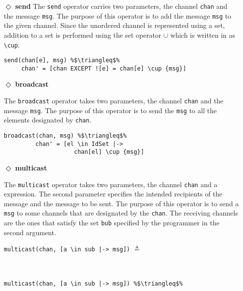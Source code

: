 \begin{itemize}
\item[$\Diamond$]  \textbf{send} The \verb|send| operator carries two parameters, the channel \verb|chan| and the message \verb|msg|. The purpose of this operator is to add the message \verb|msg| to
the given channel. Since the unordered channel is represented using a \tlaplus set, addition to a set is performed using the set operator $\cup$ which is written in \tlaplus as \lstinline|\cup|.


\begin{lstlisting}[frame = none, numbers = none, escapechar=\%]
send(chan[e], msg) %$\triangleq$% 
     chan' = [chan EXCEPT ![e] = chan[e] \cup {msg}]
\end{lstlisting}


\item[$\Diamond$]  \textbf{broadcast}

The \verb|broadcast| operator takes two parameters, the channel \verb|chan| and the message \verb|msg|. The purpose of this operator is to send the \verb|msg| to all the elements designated by \verb|chan|.


\begin{lstlisting}[frame = none, numbers = none, escapechar=\%]
broadcast(chan, msg) %$\triangleq$% 
         chan' = [el \in IdSet |-> 
                    chan[el] \cup {msg}]
\end{lstlisting}

\item[$\Diamond$] \textbf{multicast}

The \verb|multicast| operator takes two parameters, the channel \verb|chan| and a \tlaplus expression. The second parameter specifies the intended recipients of the message and the message to be sent. The purpose of this operator is to send a \verb|msg| to some channels that are designated by the \verb|chan|. The receiving channels are the ones that satisfy the set \verb|bub| specified by the programmer in the second argument.

\begin{minipage}{.4\textwidth}

\lstinline!multicast(chan, [a \in sub |-> msg])! $\triangleq$\\\\\\
\end{minipage}\hfill
\begin{minipage}{.8\textwidth}
\begin{lstlisting}[frame = none, numbers = none, escapechar=\%]
multicast(chan, [a \in sub |-> msg]) %$\triangleq$%


\end{lstlisting}
\end{minipage}
\end{itemize}
